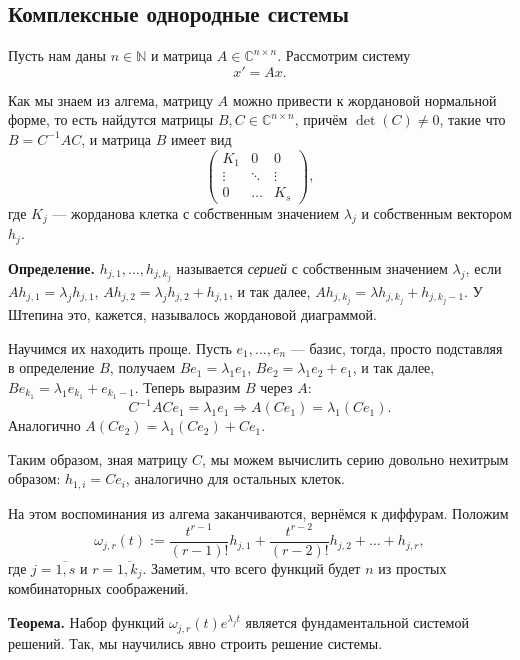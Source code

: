 \subsection{Комплексные однородные системы}
Пусть нам даны $n \in \mathbb N$ и матрица $A \in \mathbb C^{n \times n}$.
Рассмотрим систему
\begin{equation}
    x' = Ax.
\end{equation}

Как мы знаем из алгема, матрицу $A$ можно привести к жордановой нормальной форме, то есть найдутся матрицы $B, C \in \mathbb C^{n \times n}$, причём $\det(C) \ne 0$, такие что $B = C^{-1} A C$, и матрица $B$ имеет вид
\[
    \begin{pmatrix}
        K_1 & 0 & 0 \\
        \vdots & \ddots & \vdots \\
        0 & \dots & K_s
    \end{pmatrix},
\]
где $K_j$ --- жорданова клетка с собственным значением $\lambda_j$ и собственным вектором $h_j$.

\textbf{Определение.} $h_{j,1}, \dots, h_{j,k_j}$ называется \textit{серией} с собственным значением $\lambda_j$, если $Ah_{j,1} = \lambda_j h_{j,1}$, $Ah_{j,2} = \lambda_j h_{j,2} + h_{j,1}$, и так далее, $Ah_{j,k_j} = \lambda h_{j,k_j} + h_{j,k_j - 1}$.
У Штепина это, кажется, называлось жордановой диаграммой.

Научимся их находить проще.
Пусть $e_1, \dots, e_n$ --- базис, тогда, просто подставляя в определение $B$, получаем $Be_1 = \lambda_1 e_1$, $Be_2 = \lambda_1 e_2 + e_1$, и так далее, $Be_{k_1} = \lambda_1 e_{k_1} + e_{k_1 - 1}$.
Теперь выразим $B$ через $A$:
\[
    C^{-1} A C e_1 = \lambda_1 e_1 \Rightarrow A(Ce_1) = \lambda_1 (Ce_1).
\]
Аналогично $A(Ce_2) = \lambda_1 (Ce_2) + Ce_1$.

Таким образом, зная матрицу $C$, мы можем вычислить серию довольно нехитрым образом: $h_{1,i} = Ce_i$, аналогично для остальных клеток.

На этом воспоминания из алгема заканчиваются, вернёмся к диффурам.
Положим
\[
    \omega_{j,r}(t) := \frac{t^{r-1}}{(r-1)!} h_{j,1} + \frac{t^{r-2}}{(r-2)!} h_{j,2} + \dots + h_{j,r},
\]
где $j = \overline{1,s}$ и $r = \overline{1,k_j}$.
Заметим, что всего функций будет $n$ из простых комбинаторных соображений.

\textbf{Теорема.} Набор функций $\omega_{j,r}(t) e^{\lambda_j t}$ является фундаментальной системой решений.
Так, мы научились явно строить решение системы.

